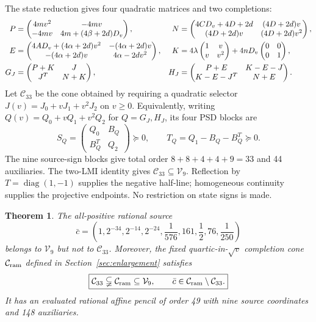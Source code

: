 \documentclass[10pt]{article}
\newtheorem{theorem}{Theorem}
\newcommand{\V}{\mathcal V_9}
\newcommand{\Cq}{\mathcal C_{33}}
\newcommand{\Cr}{\mathcal C_{\rm ram}}
\newcommand{\diag}{\operatorname{diag}}
\begin{document}
The state reduction gives four quadratic matrices and two completions:
\begin{align}
P&=\begin{pmatrix}4mv^2&-4mv\\-4mv&4m+(4\beta+2d)D_v\end{pmatrix},&
N&=\begin{pmatrix}4CD_v+4D+2d&(4D+2d)v\\(4D+2d)v&(4D+2d)v^2\end{pmatrix},\notag\\
E&=\begin{pmatrix}4AD_v+(4\alpha+2d)v^2&-(4\alpha+2d)v\\
-(4\alpha+2d)v&4\alpha-2dv^2\end{pmatrix},&
K&=4\lambda\begin{pmatrix}1&v\\v&v^2\end{pmatrix}
       +4nD_v\begin{pmatrix}0&0\\0&1\end{pmatrix},            \label{eq:PNEK}\\
G_J&=\begin{pmatrix}P+K&J\\J^T&N+K\end{pmatrix},&
H_J&=\begin{pmatrix}P+E&K-E-J\\K-E-J^T&N+E\end{pmatrix}.  \label{eq:GH}
\end{align}
Let $\Cq$ be the cone obtained by requiring a quadratic selector
$J(v)=J_0+vJ_1+v^2J_2$ on $v\geq0$. Equivalently, writing
$Q(v)=Q_0+vQ_1+v^2Q_2$ for $Q=G_J,H_J$, its four PSD blocks are
\begin{equation}
S_Q=\begin{pmatrix}Q_0&B_Q\\B_Q^T&Q_2\end{pmatrix}\succeq0,
\qquad T_Q=Q_1-B_Q-B_Q^T\succeq0.                         \label{eq:primal}
\end{equation}
The nine source-sign blocks give total order $8+8+4+4+9=33$ and 44
auxiliaries. The two-LMI identity gives $\Cq\subseteq\V$.
Reflection by $T=\diag(1,-1)$ supplies the negative half-line; homogeneous
continuity supplies the projective endpoints. No restriction on state signs
is made.

\begin{theorem}\label{thm:main}
The all-positive rational source
\begin{equation}
\boxed{\bar c=
 \left(1,2^{-34},2^{-14},2^{-24},\frac1{576},161,
                     \frac12,76,\frac1{250}\right)}         \label{eq:cbar}
\end{equation}
belongs to $\V$ but not to $\Cq$. Moreover, the fixed quartic-in-$\sqrt v$
completion cone $\Cr$ defined in Section~\ref{sec:enlargement} satisfies
\[
\boxed{\Cq\subsetneqq\Cr\subseteq\V,\qquad
       \bar c\in\Cr\setminus\Cq.}
\]
It has an evaluated rational affine pencil of order 49 with nine source
coordinates and 148 auxiliaries.
\end{theorem}
\end{document}
